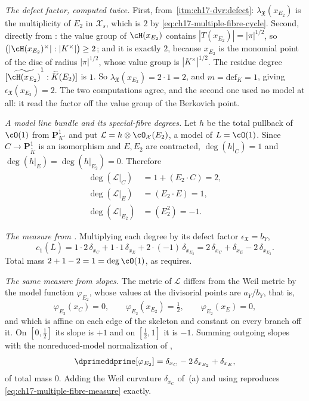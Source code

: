 \begin{example}
\emph{The defect factor, computed twice.}  First, from
\,\cref{itm:ch17-dvr:defect}:
$\lambda_{\mathfrak X}(x_{E_2})$ is the multiplicity of $E_2$ in
$\mathcal X_s$, which is $2$ by
\eqref{eq:ch17-multiple-fibre-cycle}.  Second, directly from
: the value group of $\cH(x_{E_2})$ contains
$|T(x_{E_2})|=|\pi|^{1/2}$, so
$\bigl(|\cH(x_{E_2})^\times|:|K^\times|\bigr)\ge2$; and it is exactly
$2$, because $x_{E_2}$ is the monomial point of the disc of radius
$|\pi|^{1/2}$, whose value group is $|K^\times|^{1/2}$.  The residue
degree $[\widetilde{\cH(x_{E_2})}^1:\widetilde K(E_2)]$ is $1$.  So
$\lambda_{\mathfrak X}(x_{E_2})=2\cdot1=2$, and
$m=\mathrm{def}_K=1$, giving $\epsilon_{\mathfrak X}(x_{E_2})=2$.  The
two computations agree, and the second one used no model at all: it read the
factor off the value group of the Berkovich point.

\emph{A model line bundle and its special-fibre degrees.}  Let $h$ be the
total pullback of $\cO(1)$ from $\mathbf P^1_{K^\circ}$ and put
$\mathcal L=h\otimes\cO_{\mathcal X}(E_2)$, a model of $L=\cO(1)$.  Since
$C\to\mathbf P^1_{\widetilde K}$ is an isomorphism and $E,E_2$ are
contracted, $\deg(h|_C)=1$ and $\deg(h|_E)=\deg(h|_{E_2})=0$.  Therefore
\begin{equation}
\label{eq:ch17-multiple-fibre-degrees}
 \begin{aligned}
 \deg(\mathcal L|_C)&=1+(E_2\cdot C)=2,\\
 \deg(\mathcal L|_E)&=(E_2\cdot E)=1,\\
 \deg(\mathcal L|_{E_2})&=(E_2^2)=-1 .
 \end{aligned}
\end{equation}

\emph{The measure from .}  Multiplying each
degree by its defect factor $\epsilon_{\mathfrak X}=b_Y$,
\begin{equation}
\label{eq:ch17-multiple-fibre-measure}
 c_1(\overline L)
 =1\cdot2\,\delta_{x_C}+1\cdot1\,\delta_{x_E}+2\cdot(-1)\,\delta_{x_{E_2}}
 =2\,\delta_{x_C}+\delta_{x_E}-2\,\delta_{x_{E_2}} .
\end{equation}
Total mass $2+1-2=1=\deg\cO(1)$, as  requires.

\emph{The same measure from slopes.}  The metric of $\mathcal L$ differs
from the Weil metric by the model function $\varphi_{E_2}$, whose values
at the divisorial points are $a_Y/b_Y$, that is,
\[
 \varphi_{E_2}(x_C)=0,\qquad
 \varphi_{E_2}(x_{E_2})=\tfrac12,\qquad
 \varphi_{E_2}(x_E)=0,
\]
and which is affine on each edge of the skeleton and constant on every
branch off it.  On $[0,\tfrac12]$ its slope is $+1$ and on
$[\tfrac12,1]$ it is $-1$.  Summing outgoing slopes with the
nonreduced-model normalization of
,
\[
 \dprimeddprime[\varphi_{E_2}]
 =\delta_{x_C}-2\,\delta_{x_{E_2}}+\delta_{x_E},
\]
of total mass $0$.  Adding the Weil curvature $\delta_{x_C}$ of
\,(a) and using
 reproduces
\eqref{eq:ch17-multiple-fibre-measure} exactly.


\end{example}
